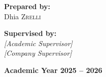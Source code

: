 \begin{titlepage}
  \begin{minipage}{0.45\linewidth}
    \begin{flushleft}\large
      \textbf{Prepared by:}\\[0.2cm]
      Dhia \textsc{Zrelli}\\[0.4cm]
    \end{flushleft}
  \end{minipage}\hfill
  \begin{minipage}{0.45\linewidth}
    \begin{flushright}\large
      \textbf{Supervised by:}\\[0.2cm]
      \textit{[Academic Supervisor]}\\[0.2cm]
      \textit{[Company Supervisor]}\\[0.4cm]
    \end{flushright}
  \end{minipage}

  \vspace{1.2cm}

  \begin{center}
  \end{center}

  \vfill
  {\large\bfseries Academic Year 2025 -- 2026\par}
  \vspace{0.4cm}
\end{titlepage}

\cleardoublepage
